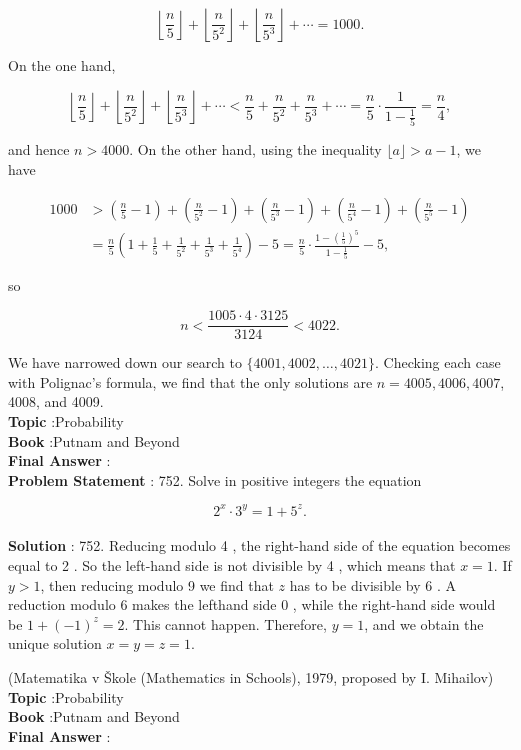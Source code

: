 \documentclass[10pt]{article}
\begin{document}
$$
\left\lfloor\frac{n}{5}\right\rfloor+\left\lfloor\frac{n}{5^{2}}\right\rfloor+\left\lfloor\frac{n}{5^{3}}\right\rfloor+\cdots=1000 .
$$

On the one hand,

$$
\left\lfloor\frac{n}{5}\right\rfloor+\left\lfloor\frac{n}{5^{2}}\right\rfloor+\left\lfloor\frac{n}{5^{3}}\right\rfloor+\cdots<\frac{n}{5}+\frac{n}{5^{2}}+\frac{n}{5^{3}}+\cdots=\frac{n}{5} \cdot \frac{1}{1-\frac{1}{5}}=\frac{n}{4},
$$

and hence $n>4000$. On the other hand, using the inequality $\lfloor a\rfloor>a-1$, we have

$$
\begin{aligned}
1000 &>\left(\frac{n}{5}-1\right)+\left(\frac{n}{5^{2}}-1\right)+\left(\frac{n}{5^{3}}-1\right)+\left(\frac{n}{5^{4}}-1\right)+\left(\frac{n}{5^{5}}-1\right) \\
&=\frac{n}{5}\left(1+\frac{1}{5}+\frac{1}{5^{2}}+\frac{1}{5^{3}}+\frac{1}{5^{4}}\right)-5=\frac{n}{5} \cdot \frac{1-\left(\frac{1}{5}\right)^{5}}{1-\frac{1}{5}}-5,
\end{aligned}
$$

so

$$
n<\frac{1005 \cdot 4 \cdot 3125}{3124}<4022 .
$$

We have narrowed down our search to $\{4001,4002, \ldots, 4021\}$. Checking each case with Polignac's formula, we find that the only solutions are $n=4005,4006,4007$, 4008, and 4009.
\\
\textbf{Topic} :Probability\\
\textbf{Book} :Putnam and Beyond\\
\textbf{Final Answer} :\\


\textbf{Problem Statement} :
752. Solve in positive integers the equation

$$
2^{x} \cdot 3^{y}=1+5^{z} .
$$
\\
\textbf{Solution} :
752. Reducing modulo 4 , the right-hand side of the equation becomes equal to 2 . So the left-hand side is not divisible by 4 , which means that $x=1$. If $y>1$, then reducing modulo 9 we find that $z$ has to be divisible by 6 . A reduction modulo 6 makes the lefthand side 0 , while the right-hand side would be $1+(-1)^{z}=2$. This cannot happen. Therefore, $y=1$, and we obtain the unique solution $x=y=z=1$.

(Matematika v Škole (Mathematics in Schools), 1979, proposed by I. Mihailov)
\\
\textbf{Topic} :Probability\\
\textbf{Book} :Putnam and Beyond\\
\textbf{Final Answer} :\\
\end{document}
